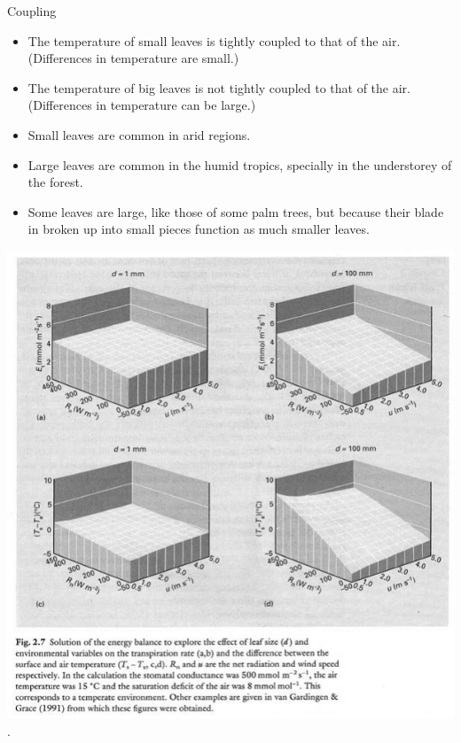 \documentclass[10pt]{beamer}
\begin{document}
\begin{frame}{Coupling}
    \begin{itemize}
        \item The temperature of small leaves is tightly coupled
        to that of the air. (Differences in temperature are small.)
        \item The temperature of big leaves is not tightly
        coupled to that of the air. (Differences in temperature can be large.)
        \item Small leaves are common in arid regions.
        \item Large leaves are common in the humid tropics,
        specially in the understorey of the forest.
        \item Some leaves are large, like those of some palm
        trees, but because their blade in broken up into small
        pieces function as much smaller leaves.
    \end{itemize}
\end{frame}

\begin{frame}{}
    \centering\includegraphics[height=0.95\textheight]{figures/Crawley2.7LeafSizeEnergyBalance}\\
    {\small \autocite[from][]{Crawley1997}.}
\end{frame}
\end{document}
